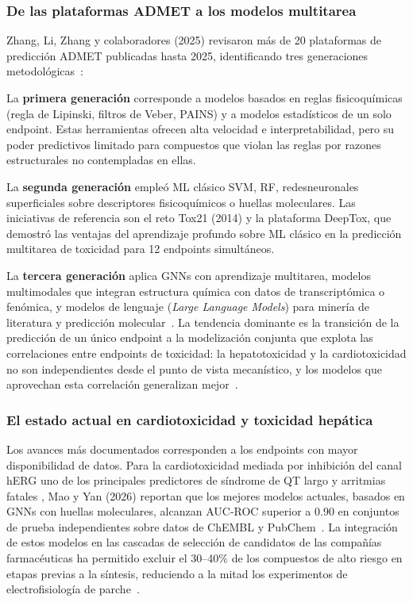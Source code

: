 \subsubsection{De las plataformas ADMET a los modelos multitarea}
 
Zhang, Li, Zhang y colaboradores (2025) revisaron más de 20 plataformas de predicción ADMET publicadas hasta 2025, identificando tres generaciones metodológicas~\cite{zhang_computational_2025}:
 
La \textbf{primera generación} corresponde a modelos basados en reglas fisicoquímicas (regla de Lipinski, filtros de Veber, PAINS) y a modelos estadísticos de un solo endpoint. Estas herramientas ofrecen alta velocidad e interpretabilidad, pero su poder predictivos limitado para compuestos que violan las reglas por razones estructurales no contempladas en ellas.
 
La \textbf{segunda generación} empleó ML clásico SVM, RF, redesneuronales superficiales sobre descriptores fisicoquímicos o huellas moleculares. Las iniciativas de referencia son el reto Tox21 (2014) y la plataforma DeepTox, que demostró las ventajas del aprendizaje profundo sobre ML clásico en la predicción multitarea de toxicidad para 12 endpoints simultáneos.
 
La \textbf{tercera generación} aplica GNNs con aprendizaje multitarea, modelos multimodales que integran estructura química con datos de transcriptómica o fenómica, y modelos de lenguaje (\textit{Large
Language Models}) para minería de literatura y predicción
molecular~\cite{zhang_computational_2025}. La tendencia dominante es la transición de la predicción de un único endpoint a la modelización conjunta que explota las correlaciones entre endpoints de toxicidad: la hepatotoxicidad y la cardiotoxicidad no son independientes desde el punto de vista mecanístico, y los modelos que aprovechan esta correlación generalizan mejor~\cite{zhang_computational_2025}.
 
\subsubsection{El estado actual en cardiotoxicidad y toxicidad
  hepática}
 
Los avances más documentados corresponden a los endpoints con mayor disponibilidad de datos. Para la cardiotoxicidad mediada por inhibición del canal hERG uno de los principales predictores de síndrome de QT largo y arritmias fatales , Mao y Yan (2026) reportan que los mejores modelos actuales, basados en GNNs con huellas moleculares, alcanzan AUC-ROC superior a 0.90 en conjuntos de prueba independientes sobre datos de ChEMBL y PubChem~\cite{mao_artificial_2026}. La integración de estos modelos en las
cascadas de selección de candidatos de las compañías farmacéuticas ha permitido excluir el 30–40\% de los compuestos de alto riesgo en etapas previas a la síntesis, reduciendo a la mitad los experimentos de electrofisiología de parche~\cite{mao_artificial_2026}.
 
